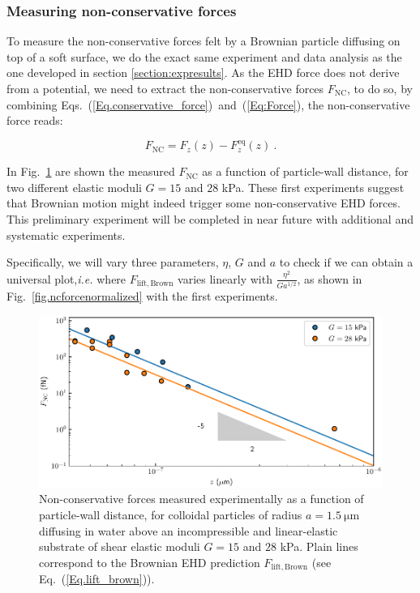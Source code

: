\subsubsection{Measuring non-conservative forces}

To measure the non-conservative forces felt by a Brownian particle diffusing on top of a soft surface, we do the exact same experiment and data analysis as the one developed in section \ref{section:expresults}. As the \gls{EHD} force does not derive from a potential, we need to extract the non-conservative forces $F_\mathrm{NC}$, to do so, by combining Eqs.~(\ref{Eq.conservative_force})~and~(\ref{Eq:Force}), the non-conservative force reads:

\begin{equation}
	F_\mathrm{NC} = F_z(z) - F_z ^\mathrm{eq}(z) ~.
\end{equation}

In Fig.~\ref{fig.ncforce} are shown the measured $F_\mathrm{NC}$ as a function of particle-wall distance, for two different elastic moduli $G=15$ and $28$ kPa. These first experiments suggest that Brownian motion might indeed trigger some non-conservative \gls{EHD} forces. This preliminary experiment will be completed in near future with additional and systematic experiments.

Specifically, we will vary three parameters, $\eta$, $G$ and $a$ to check if we can obtain a universal plot,\textit{i.e.} where $F_\mathrm{lift, Brown}$ varies linearly with $\frac{\eta^2}{Ga^{1/2}} $, as shown in Fig.~\ref{fig.ncforcenormalized} with the first experiments.

\begin{figure}[H]
	\centering
	\includegraphics{02_body/chapter4/images/EHD_forces/EHD_force.pdf}
	\caption{Non-conservative forces measured experimentally as a function of particle-wall distance, for colloidal particles of radius $a=1.5 ~\mathrm{\mu m}$ diffusing in water above an incompressible and linear-elastic substrate of shear elastic moduli $G=15$ and $28$ kPa. Plain lines correspond to the Brownian \gls{EHD} prediction $F_\mathrm{lift, Brown}$ (see Eq.~(\ref{Eq.lift_brown})).~\href{https://github.com/eXpensia/Confined-Brownian-Motion/blob/main/02_body/chapter4/images/EHD_forces/global_EHD_plot.ipynb}{\faGithub}}
	\label{fig.ncforce}
\end{figure}

